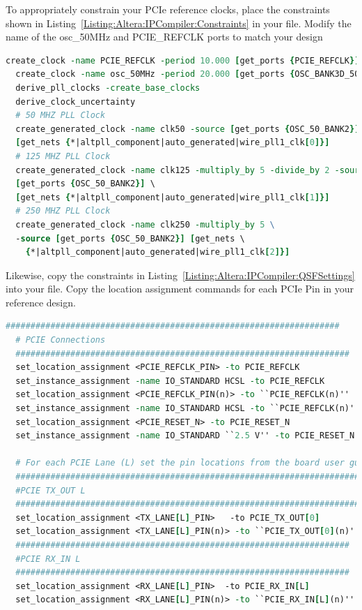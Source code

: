 \documentclass{refrep}
\newcommand{\Altera}[1]{{\color{blue}{#1}}}
\begin{document}
To appropriately constrain your PCIe reference clocks, place the constraints
shown in Listing~\ref{Listing:Altera:IPCompiler:Constraints} in your
\Altera{.sdc} file. Modify the name of the osc\_50MHz and PCIE\_REFCLK ports to
match your design
\begin{lstlisting}[language=tcl,basicstyle=\footnotesize\ttfamily,commentstyle=\color{red},
    label=Listing:Altera:IPCompiler:Constraints,
    caption=\Altera{.sdc} constraints for Qsys and Megawizard designs,frame=single]
  create_clock -name PCIE_REFCLK -period 10.000 [get_ports {PCIE_REFCLK}]
  create_clock -name osc_50MHz -period 20.000 [get_ports {OSC_BANK3D_50MHZ}]
  derive_pll_clocks -create_base_clocks
  derive_clock_uncertainty
  # 50 MHZ PLL Clock
  create_generated_clock -name clk50 -source [get_ports {OSC_50_BANK2}] \
  [get_nets {*|altpll_component|auto_generated|wire_pll1_clk[0]}]
  # 125 MHZ PLL Clock
  create_generated_clock -name clk125 -multiply_by 5 -divide_by 2 -source \
  [get_ports {OSC_50_BANK2}] \
  [get_nets {*|altpll_component|auto_generated|wire_pll1_clk[1]}]
  # 250 MHZ PLL Clock
  create_generated_clock -name clk250 -multiply_by 5 \ 
  -source [get_ports {OSC_50_BANK2}] [get_nets \
    {*|altpll_component|auto_generated|wire_pll1_clk[2]}]
\end{lstlisting}

Likewise, copy the constraints in
Listing~\ref{Listing:Altera:IPCompiler:QSFSettings} into your \Altera{.qsf}
file. Copy the location assignment commands for each PCIe Pin in your reference
design.
\begin{lstlisting}[language=tcl,basicstyle=\footnotesize\ttfamily,
    commentstyle=\color{red},label=Listing:Altera:IPCompiler:QSFSettings,
    caption=\Altera{.qsf} settings for IP Compiler Designs,frame=single]
  ###################################################################
  # PCIE Connections
  ###################################################################
  set_location_assignment <PCIE_REFCLK_PIN> -to PCIE_REFCLK
  set_instance_assignment -name IO_STANDARD HCSL -to PCIE_REFCLK
  set_location_assignment <PCIE_REFCLK_PIN(n)> -to ``PCIE_REFCLK(n)''
  set_instance_assignment -name IO_STANDARD HCSL -to ``PCIE_REFCLK(n)''
  set_location_assignment <PCIE_RESET_N> -to PCIE_RESET_N
  set_instance_assignment -name IO_STANDARD ``2.5 V'' -to PCIE_RESET_N

  # For each PCIE Lane (L) set the pin locations from the board user guide!
  ######################################################################
  #PCIE TX_OUT L
  ######################################################################
  set_location_assignment <TX_LANE[L]_PIN>   -to PCIE_TX_OUT[0]
  set_location_assignment <TX_LANE[L]_PIN(n)> -to ``PCIE_TX_OUT[0](n)''
  ###################################################################
  #PCIE RX_IN L
  ###################################################################
  set_location_assignment <RX_LANE[L]_PIN>  -to PCIE_RX_IN[L]
  set_location_assignment <RX_LANE[L]_PIN(n)> -to ``PCIE_RX_IN[L](n)''
\end{lstlisting}
\pagebreak
\end{document}
